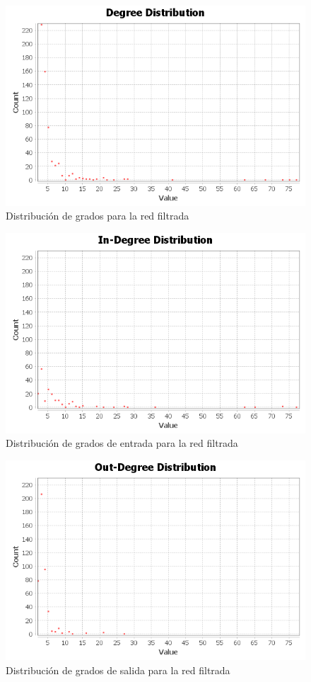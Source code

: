 \begin{figure}[H]
	\centering
	\includegraphics[width=12cm] {../images/degree-distribution}
	\caption{Distribución de grados para la red filtrada}
	\label{fig:degree-distribution}
\end{figure}

\begin{figure}[H]
	\centering
	\includegraphics[width=12cm]{../images/in-degree-distribution}
	\caption{Distribución de grados de entrada para la red filtrada}
	\label{fig:in-degree-distribution}
\end{figure}

\begin{figure}[H]
	\centering
	\includegraphics[width=12cm]{../images/out-degree-distribution}
	\caption{Distribución de grados de salida para la red filtrada}
	\label{fig:out-degree-distribution}
\end{figure}


